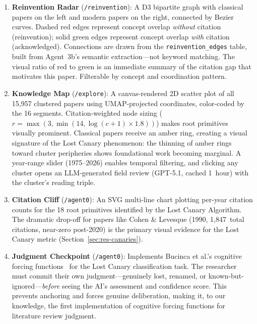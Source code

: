 \documentclass{article}
\begin{document}
\begin{enumerate}[nosep]
  \item \textbf{Reinvention Radar} (\texttt{/reinvention}): A D3 bipartite graph with
    classical papers on the left and modern papers on the right, connected by Bezier
    curves. Dashed red edges represent concept overlap \emph{without} citation
    (reinvention); solid green edges represent concept overlap \emph{with} citation
    (acknowledged). Connections are drawn from the \texttt{reinvention\_edges} table,
    built from Agent~3b's semantic extraction---not keyword matching. The visual ratio
    of red to green is an immediate summary of the citation gap that motivates this
    paper. Filterable by concept and coordination pattern.

  \item \textbf{Knowledge Map} (\texttt{/explore}): A canvas-rendered 2D scatter plot
    of all 15,957 clustered papers using UMAP-projected coordinates, color-coded by the
    16 segments. Citation-weighted node sizing
    ($r = \max(3, \min(14, \log(c{+}1) \times 1.8))$) makes root primitives visually
    prominent. Classical papers receive an amber ring, creating a visual signature of the
    Lost Canary phenomenon: the thinning of amber rings toward cluster peripheries shows
    foundational work becoming marginal. A year-range slider (1975--2026) enables temporal
    filtering, and clicking any cluster opens an LLM-generated field review
    (GPT-5.1, cached 1~hour) with the cluster's reading triple.

  \item \textbf{Citation Cliff} (\texttt{/agent0}): An SVG multi-line chart plotting
    per-year citation counts for the 18 root primitives identified by the Lost Canary
    Algorithm. The dramatic drop-off for papers like Cohen \& Levesque
    (1990, 1,847~total citations, near-zero post-2020) is the primary visual evidence for
    the Lost Canary metric (Section~\ref{sec:res-canaries}).

  \item \textbf{Judgment Checkpoint} (\texttt{/agent0}): Implements Bucinca et al.'s
    cognitive forcing functions~\citep{bucinca2021trust} for the Lost Canary
    classification task. The researcher must commit their own judgment---genuinely lost,
    renamed, or known-but-ignored---\emph{before} seeing the AI's assessment and
    confidence score. This prevents anchoring and forces genuine deliberation, making it,
    to our knowledge, the first implementation of cognitive forcing functions for
    literature review judgment.


\end{enumerate}
\end{document}
